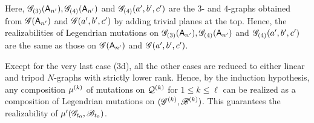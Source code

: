 Here, $\mathscr{G}_{(3)}(\mathsf{A}_{n'}), \mathscr{G}_{(4)}(\mathsf{A}_{n'})$ and $\mathscr{G}_{(4)}(a',b',c')$ are the $3$- and $4$-graphs obtained from $\mathscr{G}(\mathsf{A}_{n'})$ and $\mathscr{G}(a',b',c')$ by adding trivial planes at the top.
Hence, the realizabilities of Legendrian mutations on $\mathscr{G}_{(3)}(\mathsf{A}_{n'}), \mathscr{G}_{(4)}(\mathsf{A}_{n'})$ and $\mathscr{G}_{(4)}(a',b',c')$ are the same as those on $\mathscr{G}(\mathsf{A}_{n'})$ and $\mathscr{G}(a',b',c')$.

Except for the very last case (3d), all the other cases are reduced to either linear and tripod $N$-graphs with strictly lower rank.
Hence, by the induction hypothesis, any composition $\mu^{(k)}$ of mutations on $\mathcal{Q}^{(k)}$ for $1\leq k\leq \ell$ can be realized as a composition of Legendrian mutations on $(\mathscr{G}^{(k)},\mathscr{B}^{(k)})$.
This guarantees the realizability of $\mu'(\mathscr{G}_{t_0}, \mathscr{B}_{t_0})$.

